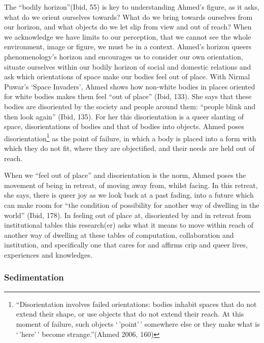 The ``bodily horizon''(Ibid, 55) is key to understanding Ahmed's figure,
as it asks, what do we orient ourselves towards? What do we bring
towards ourselves from our horizon, and what objects do we let slip from
view and out of reach? When we acknowledge we have limits to our
perception, that we cannot see the whole environment, image or figure,
we must be in a context. Ahmed's horizon queers phenomenology's horizon
and encourages us to consider our own orientation, situate ourselves
within our bodily horizon of social and domestic relations and ask which
orientations of space make our bodies feel out of place. With Nirmal
Puwar's `Space Invaders', Ahmed shows how non-white bodies in places
oriented for white bodies makes them feel ``out of place'' (Ibid, 133).
She says that these bodies are disoriented by the society and people
around them: ``people blink and then look again'' (Ibid, 135). For her
this disorientation is a queer slanting of space, disorientations of
bodies and that of bodies into objects. Ahmed poses
disorientation\footnote{``Disorientation involves failed orientations:
  bodies inhabit spaces that do not extend their shape, or use objects
  that do not extend their reach. At this moment of failure, such
  objects `\,'point'\,' somewhere else or they make what is `\,'here'\,'
  become strange.''(Ahmed 2006, 160)} as the point of failure, in which
a body is placed into a form with which they do not fit, where they are
objectified, and their needs are held out of reach.

When we ``feel out of place'' and disorientation is the norm, Ahmed
poses the movement of being in retreat, of moving away from, whilst
facing. In this retreat, she says, there is queer joy as we look back at
a past fading, into a future which can make room for ``the condition of
possibility for another way of dwelling in the world'' (Ibid, 178). In
feeling out of place at, disoriented by and in retreat from
institutional tables this research(er) asks what it means to move within
reach of another way of dwelling at these tables of computation,
collaboration and institution, and specifically one that cares for and
affirms crip and queer lives, experiences and knowledges.

\hypertarget{sedimentation}{%
\subsubsection[Sedimentation]{\texorpdfstring{\protect\hypertarget{anchor}{}{}Sedimentation}{Sedimentation}}\label{sedimentation}}


